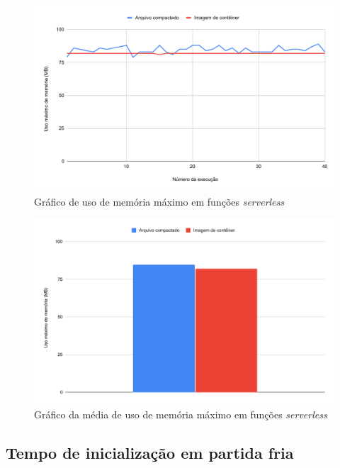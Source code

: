 \documentclass[10pt,conference]{IEEEtran}
\begin{document}
\begin{figure}[htbp]
    \centering 
    \includegraphics [width=\linewidth]{images/max-memory-use-PT.pdf}
    \par
    \caption{Gráfico de uso de memória máximo em funções \textit{serverless}}
    \label{graph:functions_max_memory_used}
\end{figure}

\begin{figure}[htbp]
    \centering 
    \includegraphics [width=\linewidth]{images/max-memory-use-average-PT.pdf}
    \par
    \caption{Gráfico da média de uso de memória máximo em funções \textit{serverless}}
    \label{graph:functions_max_memory_used_average}
\end{figure}

\subsection{Tempo de inicialização em partida fria} 
\label{subsec:cold_start_time}
\end{document}
